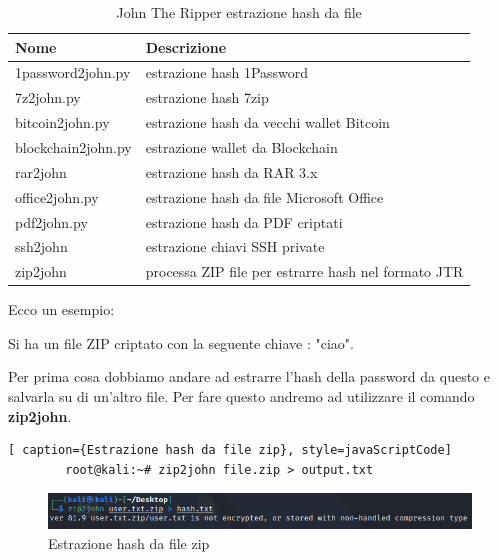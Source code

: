 \begin{table}[htbp]
    \begin{center}
    \begin{tabular}{|l|l|}
    \hline
    \textbf{Nome} & \textbf{Descrizione} \\
    \hline
    1password2john.py & estrazione hash 1Password \\
    \hline
    7z2john.py & estrazione hash 7zip \\
    \hline
    bitcoin2john.py & estrazione hash da vecchi wallet Bitcoin \\
    \hline
    blockchain2john.py & estrazione wallet da Blockchain \\
    \hline
    rar2john & estrazione hash da RAR 3.x \\
    \hline
    office2john.py & estrazione hash da file Microsoft Office \\
    \hline
    pdf2john.py & estrazione hash da PDF criptati \\
    \hline
    ssh2john & estrazione chiavi SSH private \\
    \hline
    zip2john & processa ZIP file per estrarre hash nel formato JTR \\
    \hline
    

    \end{tabular}
    \end{center}
    \caption{John The Ripper estrazione hash da file}
    \label{tab:browser}
    \end{table}

    Ecco un esempio:

    Si ha un file ZIP criptato con la seguente chiave : "ciao".

    Per prima cosa dobbiamo andare ad estrarre l'hash della password da questo e salvarla su di un'altro file. Per fare questo andremo ad utilizzare il comando \textbf{zip2john}.

    \begin{lstlisting}[ caption={Estrazione hash da file zip}, style=javaScriptCode]
        root@kali:~# zip2john file.zip > output.txt
    \end{lstlisting}

    \begin{figure}[h!]
        \centering
        \includegraphics[width=\linewidth]{Immagini/3/hash_ex.png}
        \caption{Estrazione hash da file zip}
    \end{figure}

